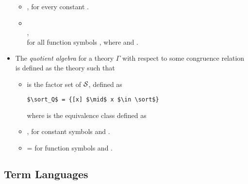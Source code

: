 \begin{itemize}
    \begin{itemize}
    \item {}, for every constant .  
    \item {} \\
    , \\
    for all function symbols , where  and . 
    \end{itemize}
    
    \item The \emph{quotient algebra} for a theory $\Gamma$ with respect to some congruence relation \lstmath{$\equiv$} is defined as the theory  such that 
    \begin{itemize}
       \item {} is the factor set of $\mathcal{S}$, defined as 
       	\begin{lstlisting}[mathescape]
       	$\sort_Q$ = {[x] $\mid$ x $\in \sort$}
       	\end{lstlisting} 
       	where \lstmath{[x]} is the equivalence class defined as 
       \item {}, for constant symbols  and .  
       \item {} = \lstmath{[f x$_1$ $\ \cdots\ $ x$_n$]}
       for function symbols  and .
    \end{itemize}      

\end{itemize}

\subsection*{Term Languages}

